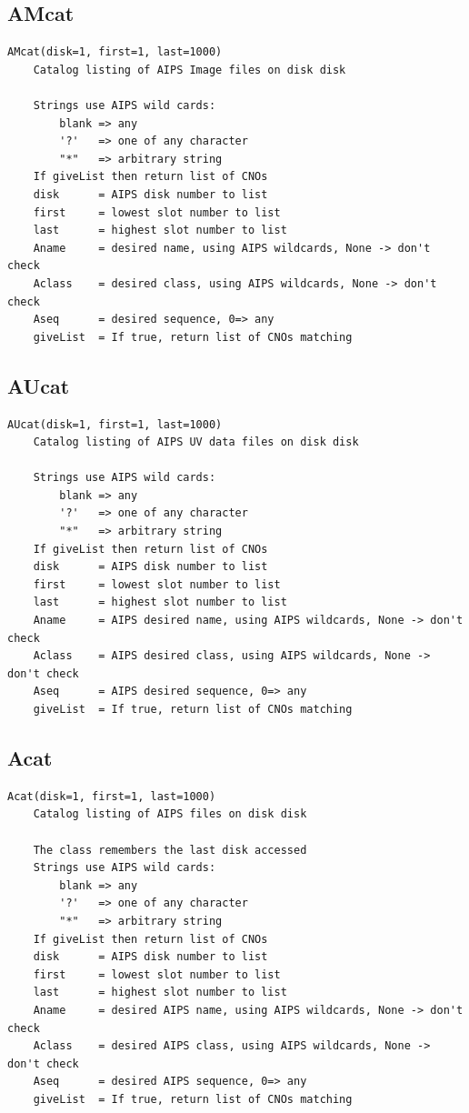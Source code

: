 \documentclass[11pt]{report}
\begin{document}
\subsection{AMcat}
\begin{verbatim}
AMcat(disk=1, first=1, last=1000)
    Catalog listing of AIPS Image files on disk disk
    
    Strings use AIPS wild cards:
        blank => any
        '?'   => one of any character
        "*"   => arbitrary string
    If giveList then return list of CNOs
    disk      = AIPS disk number to list
    first     = lowest slot number to list
    last      = highest slot number to list
    Aname     = desired name, using AIPS wildcards, None -> don't check
    Aclass    = desired class, using AIPS wildcards, None -> don't check
    Aseq      = desired sequence, 0=> any
    giveList  = If true, return list of CNOs matching
\end{verbatim}

\subsection{AUcat}
\begin{verbatim}
AUcat(disk=1, first=1, last=1000)
    Catalog listing of AIPS UV data files on disk disk
    
    Strings use AIPS wild cards:
        blank => any
        '?'   => one of any character
        "*"   => arbitrary string
    If giveList then return list of CNOs
    disk      = AIPS disk number to list
    first     = lowest slot number to list
    last      = highest slot number to list
    Aname     = AIPS desired name, using AIPS wildcards, None -> don't check
    Aclass    = AIPS desired class, using AIPS wildcards, None -> don't check
    Aseq      = AIPS desired sequence, 0=> any
    giveList  = If true, return list of CNOs matching
\end{verbatim}

\subsection{Acat}
\begin{verbatim}
Acat(disk=1, first=1, last=1000)
    Catalog listing of AIPS files on disk disk
    
    The class remembers the last disk accessed
    Strings use AIPS wild cards:
        blank => any
        '?'   => one of any character
        "*"   => arbitrary string
    If giveList then return list of CNOs
    disk      = AIPS disk number to list
    first     = lowest slot number to list
    last      = highest slot number to list
    Aname     = desired AIPS name, using AIPS wildcards, None -> don't check
    Aclass    = desired AIPS class, using AIPS wildcards, None -> don't check
    Aseq      = desired AIPS sequence, 0=> any
    giveList  = If true, return list of CNOs matching
\end{verbatim}
\end{document}
